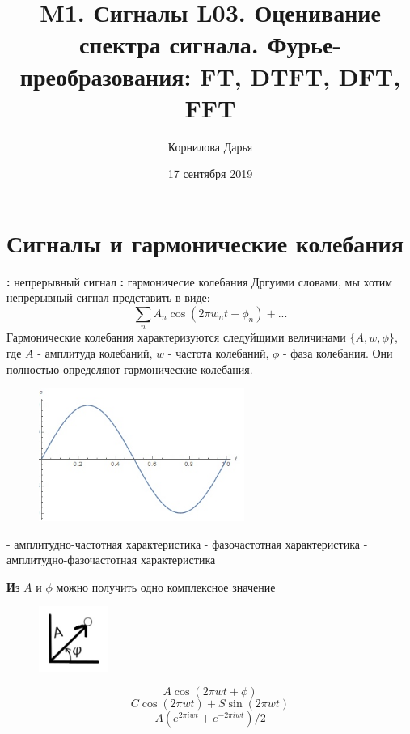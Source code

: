 \documentclass{article}
\begin{document}
 
\title{M1. Сигналы \newline
\textbf{L03. Оценивание спектра сигнала. Фурье-преобразования: FT, DTFT, DFT, FFT} }
\author{\large{Корнилова Дарья}}
\date{17 сентября 2019}
\maketitle


\section{\label{s1}Сигналы и гармонические колебания}
\par \textbf{ :} непрерывный сигнал \newline
\textbf{ :} гармоничесие колебания \newline
Дргуими словами, мы хотим непрерывный сигнал представить в виде:
$$\sum_{n} A_{n} \cos{(2 \pi w_{n} t + \phi_{n}) + ...}$$
Гармонические колебания характеризуются следуйщими величинами $\{A, w, \phi \}$, где $A$ - амплитуда колебаний, $w$ - частота колебаний, $\phi$ - фаза колебания. Они полностью определяют гармонические колебания. 
\newline
\begin{figure}[H]
 \centering
  \includegraphics[width=0.6\textwidth]{pig4.jpg}
  \label{Fig1}
\end{figure}


\textbf{} - амплитудно-частотная характеристика \newline
\textbf{} - фазочастотная характеристика \newline
\textbf{} - амплитудно-фазочастотная характеристика

\par\textbf Из $A$ и $\phi$ можно получить одно комплексное значение \newline
\begin{figure}[H]
 \centering
  \includegraphics[width=0.2\textwidth]{pig3.jpg}
  \label{Fig2}
\end{figure}
$$A \cos{(2 \pi w t +\phi)}$$ 
$$C \cos{(2 \pi w t)} + S \sin{(2 \pi w t)}$$
$$A (e^{2 \pi i w t} + e^{-2 \pi i w t})/2$$
\end{document}
